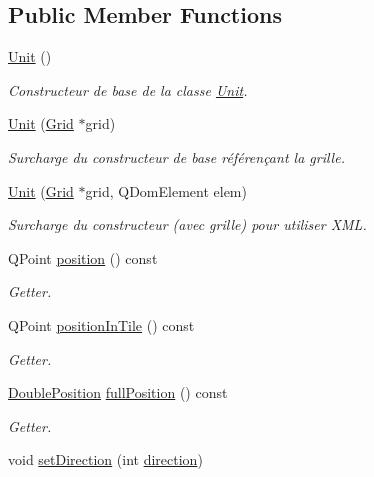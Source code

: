 \subsection*{Public Member Functions}
\begin{DoxyCompactItemize}
\item 
\hyperlink{class_unit_a8e46f663a95736c8002d85ab271a7581}{Unit} ()
\begin{DoxyCompactList}\small\item\em Constructeur de base de la classe \hyperlink{class_unit}{Unit}. \end{DoxyCompactList}\item 
\hyperlink{class_unit_a581eba4325543aef767722a162ca99cb}{Unit} (\hyperlink{class_grid}{Grid} $\ast$grid)
\begin{DoxyCompactList}\small\item\em Surcharge du constructeur de base référençant la grille. \end{DoxyCompactList}\item 
\hyperlink{class_unit_ab4ca2daa555261d2fa1b8f0edbba667c}{Unit} (\hyperlink{class_grid}{Grid} $\ast$grid, Q\+Dom\+Element elem)
\begin{DoxyCompactList}\small\item\em Surcharge du constructeur (avec grille) pour utiliser X\+M\+L. \end{DoxyCompactList}\item 
Q\+Point \hyperlink{class_unit_a1f96c746ab2d0cc7956e73d59d9c7c70}{position} () const 
\begin{DoxyCompactList}\small\item\em Getter. \end{DoxyCompactList}\item 
Q\+Point \hyperlink{class_unit_a57e72aa7298681d991bf37966d9f2943}{position\+In\+Tile} () const 
\begin{DoxyCompactList}\small\item\em Getter. \end{DoxyCompactList}\item 
\hyperlink{class_double_position}{Double\+Position} \hyperlink{class_unit_a115a97bb5d63670215d42dddc46c9c99}{full\+Position} () const 
\begin{DoxyCompactList}\small\item\em Getter. \end{DoxyCompactList}\item 
void \hyperlink{class_unit_a2424bd74d829e4fc79aa97a083918841}{set\+Direction} (int \hyperlink{class_unit_a5d8a5a789acfa4d2502b0c1082876172}{direction})

\end{DoxyCompactItemize}
